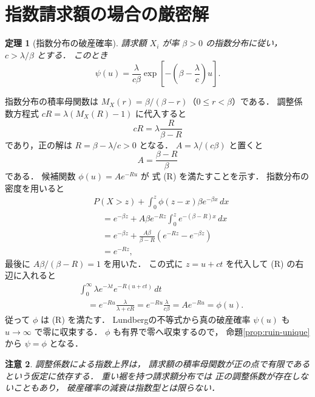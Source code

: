 \documentclass[a5paper,10pt,onecolumn]{jsarticle}
\makeatletter
\theoremstyle{mathnotetheorem}
\newtheorem{theorem}{定理}[section]
\newtheorem{remark}[theorem]{注意}
\renewcommand{\proofname}{証明}
\renewenvironment{proof}[1][\proofname]{%
  \par\pushQED{\qed}\normalfont\topsep4\p@\@plus2\p@\relax
  \trivlist\item[\hskip\labelsep\bfseries #1]\ignorespaces
}{\popQED\endtrivlist\@endpefalse}
\makeatother
\begin{document}
\section{指数請求額の場合の厳密解}

\begin{theorem}[指数分布の破産確率]\label{thm:exponential-ruin}
請求額 $X_i$ が率 $\beta>0$ の指数分布に従い，
$c>\lambda/\beta$ とする．
このとき
\[
 \psi(u)=\frac{\lambda}{c\beta}
 \exp\!\left[-\left(\beta-\frac\lambda c\right)u\right].
\]
\end{theorem}
\begin{proof}
指数分布の積率母関数は
$M_X(r)=\beta/(\beta-r)$（$0\le r<\beta$）である．
調整係数方程式
$cR=\lambda(M_X(R)-1)$ に代入すると
\[
 cR=\lambda\frac R{\beta-R}
\]
であり，正の解は
$R=\beta-\lambda/c>0$ となる．
$A=\lambda/(c\beta)$ と置くと
\[
 A=\frac{\beta-R}{\beta}
\]
である．
候補関数 $\phi(u)=Ae^{-Ru}$ が
式 (R) を満たすことを示す．
指数分布の密度を用いると
\begin{align*}
 &P(X>z)+\int_0^z\phi(z-x)\beta e^{-\beta x}\,dx\\
 &\quad=e^{-\beta z}
 +A\beta e^{-Rz}
   \int_0^z e^{-(\beta-R)x}\,dx\\
 &\quad=e^{-\beta z}
 +\frac{A\beta}{\beta-R}
  (e^{-Rz}-e^{-\beta z})\\
 &\quad=e^{-Rz},
\end{align*}
最後に $A\beta/(\beta-R)=1$ を用いた．
この式に $z=u+ct$ を代入して (R) の右辺に入れると
\begin{align*}
 &\int_0^\infty\lambda e^{-\lambda t}
 e^{-R(u+ct)}\,dt\\
 &\quad=e^{-Ru}\frac{\lambda}{\lambda+cR}
 =e^{-Ru}\frac{\lambda}{c\beta}
 =Ae^{-Ru}=\phi(u).
\end{align*}
従って $\phi$ は (R) を満たす．
Lundbergの不等式から真の破産確率 $\psi(u)$ も
$u\to\infty$ で零に収束する．
$\phi$ も有界で零へ収束するので，
命題\ref{prop:ruin-unique}から
$\psi=\phi$ となる．
\end{proof}

\begin{remark}
調整係数による指数上界は，
請求額の積率母関数が正の点で有限であるという仮定に依存する．
重い裾を持つ請求額分布では
正の調整係数が存在しないこともあり，
破産確率の減衰は指数型とは限らない．
\end{remark}
\end{document}
